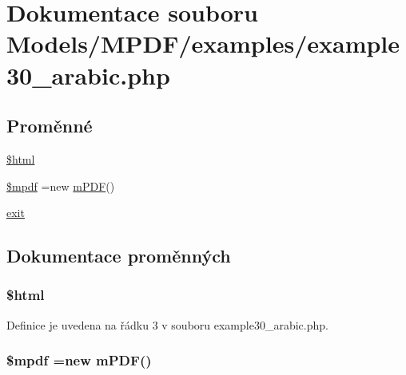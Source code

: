 \hypertarget{example30__arabic_8php}{\section{Dokumentace souboru Models/\-M\-P\-D\-F/examples/example30\-\_\-arabic.php}
\label{example30__arabic_8php}
}
\subsection*{Proměnné}
\begin{DoxyCompactItemize}
\item 
\hyperlink{example30__arabic_8php_a6f96e7fc92441776c9d1cd3386663b40}{\$html}
\item 
\hyperlink{example30__arabic_8php_ad028f81910d6cbab9b184d2214b3a8f8}{\$mpdf} =new \hyperlink{classm_p_d_f}{m\-P\-D\-F}()
\item 
\hyperlink{example30__arabic_8php_a6733eb5f605d09eaede9845835d71c4e}{exit}
\end{DoxyCompactItemize}


\subsection{Dokumentace proměnných}
\hypertarget{example30__arabic_8php_a6f96e7fc92441776c9d1cd3386663b40}{
\subsubsection[{\$html}]{\setlength{\rightskip}{0pt plus 5cm}\$html}}\label{example30__arabic_8php_a6f96e7fc92441776c9d1cd3386663b40}


Definice je uvedena na řádku 3 v souboru example30\-\_\-arabic.\-php.

\hypertarget{example30__arabic_8php_ad028f81910d6cbab9b184d2214b3a8f8}{
\subsubsection[{\$mpdf}]{\setlength{\rightskip}{0pt plus 5cm}\$mpdf =new {\bf m\-P\-D\-F}()}}\label{example30__arabic_8php_ad028f81910d6cbab9b184d2214b3a8f8}


